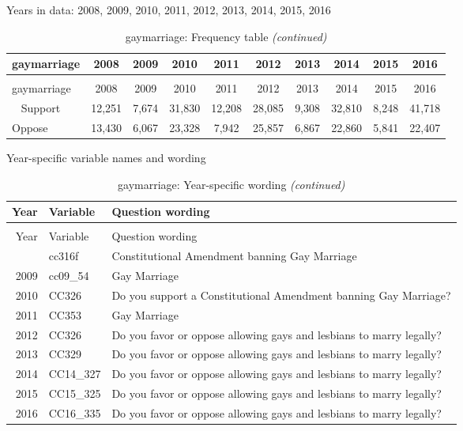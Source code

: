 \documentclass[12pt]{article}
\begin{document}
Years in data: 2008, 2009, 2010, 2011, 2012, 2013, 2014, 2015, 2016

\begin{longtable}[t]{lccccccccc}
\caption{\label{tab:unnamed-chunk-4}gaymarriage: Frequency table}\\
\toprule
gaymarriage & 2008 & 2009 & 2010 & 2011 & 2012 & 2013 & 2014 & 2015 & 2016\\
\midrule
\endfirsthead
\caption[]{gaymarriage: Frequency table \textit{(continued)}}\\
\toprule
gaymarriage & 2008 & 2009 & 2010 & 2011 & 2012 & 2013 & 2014 & 2015 & 2016\\
\midrule
\endhead
\
\endfoot
\bottomrule
\endlastfoot
Support & 12,251 & 7,674 & 31,830 & 12,208 & 28,085 & 9,308 & 32,810 & 8,248 & 41,718\\
Oppose & 13,430 & 6,067 & 23,328 & 7,942 & 25,857 & 6,867 & 22,860 & 5,841 & 22,407\\*
\end{longtable}

Year-specific variable names and wording

\begin{longtable}[t]{rl>{\raggedright\arraybackslash}p{10cm}}
\caption{\label{tab:unnamed-chunk-4}gaymarriage: Year-specific wording}\\
\toprule
Year & Variable & Question wording\\
\midrule
\endfirsthead
\caption[]{gaymarriage: Year-specific wording \textit{(continued)}}\\
\toprule
Year & Variable & Question wording\\
\midrule
\endhead
\
\endfoot
\bottomrule
\endlastfoot
2008 & cc316f & Constitutional Amendment banning Gay Marriage\\
2009 & cc09\_54 & Gay Marriage\\
2010 & CC326 & Do you support a Constitutional Amendment banning Gay Marriage?\\
2011 & CC353 & Gay Marriage\\
2012 & CC326 & Do you favor or oppose allowing gays and lesbians to marry legally?\\
2013 & CC329 & Do you favor or oppose allowing gays and lesbians to marry legally?\\
2014 & CC14\_327 & Do you favor or oppose allowing gays and lesbians to marry legally?\\
2015 & CC15\_325 & Do you favor or oppose allowing gays and lesbians to marry legally?\\
2016 & CC16\_335 & Do you favor or oppose allowing gays and lesbians to marry legally?\\*
\end{longtable}
\end{document}

